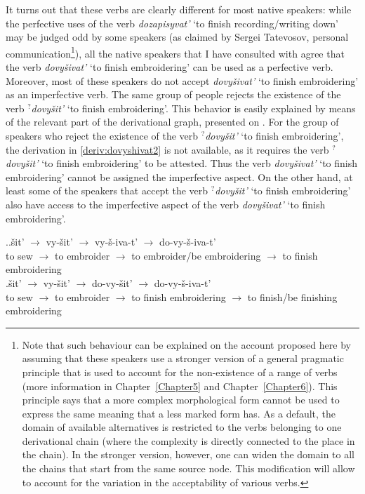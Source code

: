 It turns out that these verbs are clearly different for most native speakers: while the perfective uses of the verb \textit{dozapisyvat'} `to finish recording/writing down' may be judged odd by some speakers (as claimed by Sergei Tatevosov, personal communication\footnote{Note that such behaviour can be explained on the account proposed here by assuming that these speakers use a stronger version of a general pragmatic principle that is used to account for the non-existence of a range of verbs (more information in Chapter~\ref{Chapter5} and Chapter~\ref{Chapter6}). This principle says that a more complex morphological form cannot be used to express the same meaning that a less marked form has. As a default, the domain of available alternatives is restricted to the verbs belonging to one derivational chain (where the complexity is directly connected to the place in the chain). In the stronger version, however, one can widen the domain to all the chains that start from the same source node. This modification will allow to account for the variation in the acceptability of various verbs.}), all the native speakers that I have consulted with agree that the verb \textit{dovy\v{s}ivat'} `to finish embroidering' can be used as a perfective verb. Moreover, most of these speakers do not accept \textit{dovy\v{s}ivat'} `to finish embroidering' as an imperfective verb. The same group of people rejects the existence of the verb $^?$\textit{dovy\v{s}it'}\textsuperscript{\PF} `to finish embroidering'. This behavior is easily explained by means of the relevant part of the derivational graph, presented on . For the group of speakers who reject the existence of the verb $^?$\textit{dovy\v{s}it'}\textsuperscript{\PF} `to finish embroidering', the derivation in \ref{deriv:dovyshivat2} is not available, as it requires the verb $^?$\textit{dovy\v{s}it'}\textsuperscript{\PF} `to finish embroidering' to be attested. Thus the verb \textit{dovy\v{s}ivat'} `to finish embroidering' cannot be assigned the imperfective aspect. On the other hand, at least some of the speakers that accept the verb $^?$\textit{dovy\v{s}it'}\textsuperscript{\PF} `to finish embroidering' also have access to the imperfective aspect of the verb \textit{dovy\v{s}ivat'} `to finish embroidering'.

\ex.\label{deriv:dovyshivat}\ag.\label{deriv:dovyshivat1}\v{s}it'\textsuperscript{\IPF} $\rightarrow$ vy-\v{s}it'\textsuperscript{\PF} $\rightarrow$ vy-\v{s}-iva-t'\textsuperscript{\IPF} $\rightarrow$ do-vy-\v{s}-iva-t'\textsuperscript{\PF}\\
{to sew} $\rightarrow$ {to embroider} $\rightarrow$ {to embroider/be embroidering} $\rightarrow$ {to finish embroidering}\\
\bg.\label{deriv:dovyshivat2}\v{s}it'\textsuperscript{\IPF} $\rightarrow$ vy-\v{s}it'\textsuperscript{\PF} $\rightarrow$ do-vy-\v{s}it'\textsuperscript{\PF} $\rightarrow$ do-vy-\v{s}-iva-t'\textsuperscript{\IPF}\\
{to sew} $\rightarrow$ {to embroider} $\rightarrow$ {to finish embroidering} $\rightarrow$ {to finish/be finishing embroidering}\\

